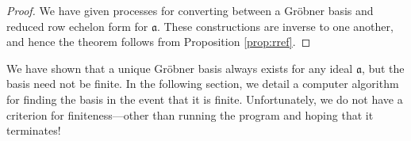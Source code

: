 \begin{proof}
	We have given processes for converting between a Gr\"obner basis and reduced row echelon form for $\mathfrak{a}$. These constructions are inverse to one another, and hence the theorem follows from Proposition \ref{prop:rref}.
\end{proof}
We have shown that a unique Gr\"obner basis always exists for any ideal $\mathfrak{a}$, but the basis need not be finite. In the following section, we detail a computer algorithm for finding the basis in the event that it is finite. Unfortunately, we do not have a criterion for finiteness---other than running the program and hoping that it terminates!